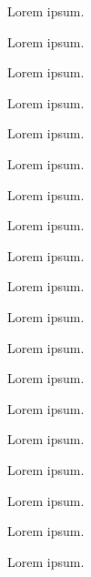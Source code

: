 Lorem ipsum.


Lorem ipsum.


Lorem ipsum.


Lorem ipsum.


Lorem ipsum.


Lorem ipsum.


Lorem ipsum.


Lorem ipsum.


Lorem ipsum.


Lorem ipsum.


Lorem ipsum.


Lorem ipsum.


Lorem ipsum.


Lorem ipsum.


Lorem ipsum.


Lorem ipsum.


Lorem ipsum.


Lorem ipsum.


Lorem ipsum.
